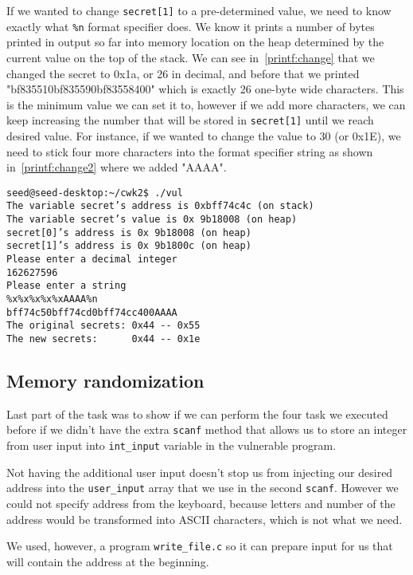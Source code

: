 \documentclass[12pt, a4paper, pdflatex]{article}
\begin{document}
If we wanted to change \texttt{secret[1]} to a pre-determined value, we need to know exactly what \texttt{\%n} format specifier does. We know it prints a number of bytes printed in output so far into memory location on the heap determined by the current value on the top of the stack. We can see in~\ref{printf:change} that we changed the secret to 0x1a, or 26 in decimal, and before that we printed "bf835510bf835590bf83558400" which is exactly 26 one-byte wide characters. This is the minimum value we can set it to, however if we add more characters, we can keep increasing the number that will be stored in \texttt{secret[1]} until we reach desired value. For instance, if we wanted to change the value to 30 (or 0x1E), we need to stick four more characters into the format specifier string as shown in~\ref{printf:change2} where we added "AAAA".  

\vspace{1em}
\lstset{
	captionpos=b,
	frame=single,
	language=BASH,
	caption=Example of overwriting memory with a specified value,
	label=printf:change2,
	breaklines=true,
}
\begin{lstlisting}
seed@seed-desktop:~/cwk2$ ./vul
The variable secret’s address is 0xbff74c4c (on stack)
The variable secret’s value is 0x 9b18008 (on heap)
secret[0]’s address is 0x 9b18008 (on heap)
secret[1]’s address is 0x 9b1800c (on heap)
Please enter a decimal integer
162627596
Please enter a string
%x%x%x%x%xAAAA%n
bff74c50bff74cd0bff74cc400AAAA
The original secrets: 0x44 -- 0x55
The new secrets:      0x44 -- 0x1e
\end{lstlisting}

\subsection{Memory randomization}

Last part of the task was to show if we can perform the four task we executed before if we didn't have the extra \texttt{scanf} method that allows us to store an integer from user input into \texttt{int\_input} variable in the vulnerable program.

Not having the additional user input doesn't stop us from injecting our desired address into the \texttt{user\_input} array that we use in the second \texttt{scanf}. However we could not specify address from the keyboard, because letters and number of the address would be transformed into ASCII characters, which is not what we need.

We used, however, a program \texttt{write\_file.c} so it can prepare input for us that will contain the address at the beginning.
\end{document}
